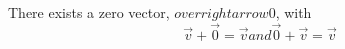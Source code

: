 \documentclass[preview]{standalone}
\begin{document}
\begin{center}
There exists a zero vector, \(overrightarrow{0}\), with \[\overrightarrow{v} + \overrightarrow{0} = \overrightarrow{v} and \overrightarrow{0} + \overrightarrow{v} = \overrightarrow{v}\]
\end{center}
\end{document}
